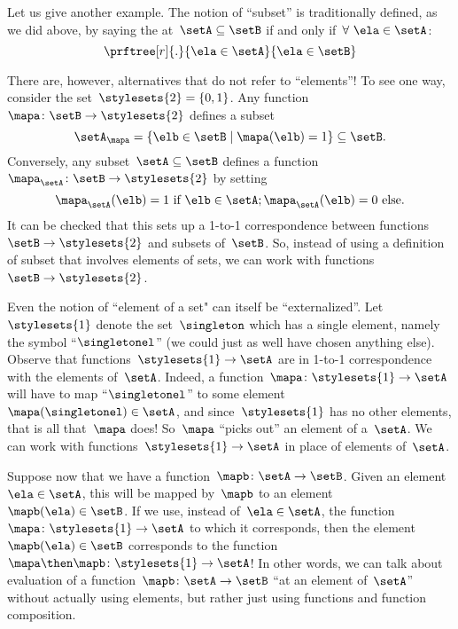 Let us give another example.
The notion of ``subset'' is traditionally defined, as we did above, by saying the at~$\setA \subseteq \setB$ if and only if~$\forall \ \ela \in \setA$:
\begin{equation*}
    \prftree[r]{.}{\ela \in \setA }{\ela \in \setB}
\end{equation*}

There are, however, alternatives that do not refer to ``elements''!
To see one way, consider the set~$\stylesets{2} = \{ 0, 1\}$.
Any function~$\mapa \colon \setB \to \stylesets{2}$ defines a subset
\begin{equation*}
    \setA_\mapa = \{ \elb \in \setB \mid \mapa(\elb) = 1 \} \subseteq \setB.
\end{equation*}
Conversely, any subset~$\setA \subseteq \setB$ defines a function~$\mapa_\setA \colon \setB \to \stylesets{2}$ by setting
\begin{equation*}
    \mapa_\setA(\elb) = 1 \text{ if } \elb \in \setA; \mapa_\setA(\elb) = 0 \text{ else}.
\end{equation*}
It can be checked that this sets up a 1-to-1 correspondence between functions~$\setB \to \stylesets{2}$ and subsets of~$\setB$.
So, instead of using a definition of subset that involves elements of sets, we can work with functions~$\setB \to \stylesets{2}$.

Even the notion of ``element of a set" can itself be ``externalized''.
Let~$\stylesets{1}$ denote the set~$\singleton$ which has a single element, namely the symbol ``$\singletonel$'' (we could just as well have chosen anything else).
Observe that functions~$\stylesets{1} \to \setA$ are in 1-to-1 correspondence with the elements of~$\setA$.
Indeed, a function~$\mapa\colon \stylesets{1} \to \setA$ will have to map ``$\singletonel$'' to some element~$\mapa(\singletonel) \in \setA$, and since~$\stylesets{1}$ has no other elements, that is all that~$\mapa$ does!
So~$\mapa$ ``picks out'' an element of a~$\setA$.
We can work with functions~$\stylesets{1} \to \setA$ in place of elements of~$\setA$.

Suppose now that we have a function~$\mapb \colon \setA \to \setB$.
Given an element~$\ela \in \setA$, this will be mapped by~$\mapb$ to an element~$\mapb(\ela) \in \setB$.
If we use, instead of~$\ela \in \setA$, the function~$\mapa \colon \stylesets{1} \to \setA$ to which it corresponds, then the element~$\mapb(\ela) \in \setB$ corresponds to the function~$\mapa \then \mapb\colon \stylesets{1} \to \setA$!
In other words, we can talk about evaluation of a function~$\mapb \colon \setA \to \setB$ ``at an element of~$\setA$'' without actually using elements, but rather just using functions and function composition.




